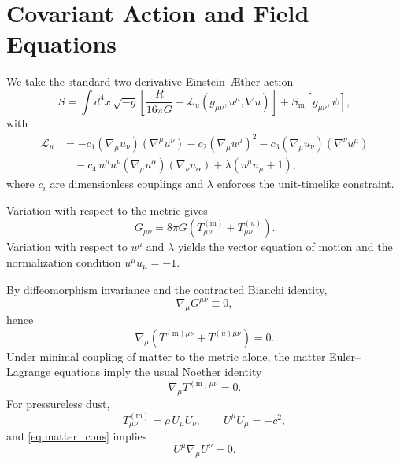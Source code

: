 \documentclass[12pt,a4paper]{article}
\newcommand{\AEther}{\AE{}ther}
\newcommand{\Sm}{S_{\mathrm{m}}}
\newcommand{\Tmm}{T^{(\mathrm{m})}_{\mu\nu}}
\newcommand{\Tuu}{T^{(u)}_{\mu\nu}}
\begin{document}
    \section{Covariant Action and Field Equations}
        \label{sec:action}
        
        We take the standard two-derivative Einstein--\AEther{} action
        \citep{jacobson2001,jacobson2008}
        \begin{equation}
            S = \int d^4x\,\sqrt{-g}\left[
                                        \frac{R}{16\pi G} + \mathcal{L}_u(g_{\mu\nu},u^\mu,\nabla u)
            \right] + \Sm[g_{\mu\nu},\psi],
            \label{eq:S}
        \end{equation}
        with
        \begin{align}
            \mathcal{L}_u
            &=
            -c_1 (\nabla_\mu u_\nu)(\nabla^\mu u^\nu)
            -c_2 (\nabla_\mu u^\mu)^2
            -c_3 (\nabla_\mu u_\nu)(\nabla^\nu u^\mu)
            \nonumber\\
            &\quad
            -c_4\, u^\mu u^\nu (\nabla_\mu u^\alpha)(\nabla_\nu u_\alpha)
            +\lambda(u^\mu u_\mu + 1),
            \label{eq:Lu}
        \end{align}
        where $c_i$ are dimensionless couplings and $\lambda$ enforces the unit-timelike
        constraint.
        
        Variation with respect to the metric gives
        \begin{equation}
            G_{\mu\nu}=8\pi G\left(\Tmm+\Tuu\right).
        \end{equation}
        Variation with respect to $u^\mu$ and $\lambda$ yields the vector equation of
        motion and the normalization condition $u^\mu u_\mu=-1$.
        
        By diffeomorphism invariance and the contracted Bianchi identity,
        \begin{equation}
            \nabla_\mu G^{\mu\nu}\equiv 0,
        \end{equation}
        hence
        \begin{equation}
            \nabla_\mu\left(T^{(\mathrm m)\mu\nu}+T^{(u)\mu\nu}\right)=0.
            \label{eq:total_cons}
        \end{equation}
        Under minimal coupling of matter to the metric alone, the matter Euler--Lagrange
        equations imply the usual Noether identity
        \begin{equation}
            \nabla_\mu T^{(\mathrm m)\mu\nu}=0.
            \label{eq:matter_cons}
        \end{equation}
        For pressureless dust,
        \begin{equation}
            T^{(\mathrm m)}_{\mu\nu} = \rho\, U_\mu U_\nu,
            \qquad
            U^\mu U_\mu = -c^2,
        \end{equation}
        and \cref{eq:matter_cons} implies
        \begin{equation}
            U^\mu \nabla_\mu U^\nu = 0.
        \end{equation}
        
\end{document}
